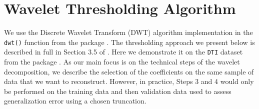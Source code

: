 \section{Wavelet Thresholding Algorithm}\label{sec:wavelet-thresholding-algorithm}

We use the Discrete Wavelet Transform (DWT) algorithm implementation in the \texttt{dwt()} function from the   package \parencite{whitcher_waveslim_2024}.
The thresholding approach we present below is described in full in Section 3.5 of \textcite{morris_automated_2011}. Here we demonstrate it on the \texttt{DTI} dataset from the   package \parencite{goldsmith_refund_2020}.
As our main focus is on the technical steps of the wavelet decomposition, we describe the selection of the coefficients on the same sample of data that we want to reconstruct. However, in practice, Steps 3 and 4 would only be performed on the training data and then validation data used to assess generalization error using a chosen truncation.

